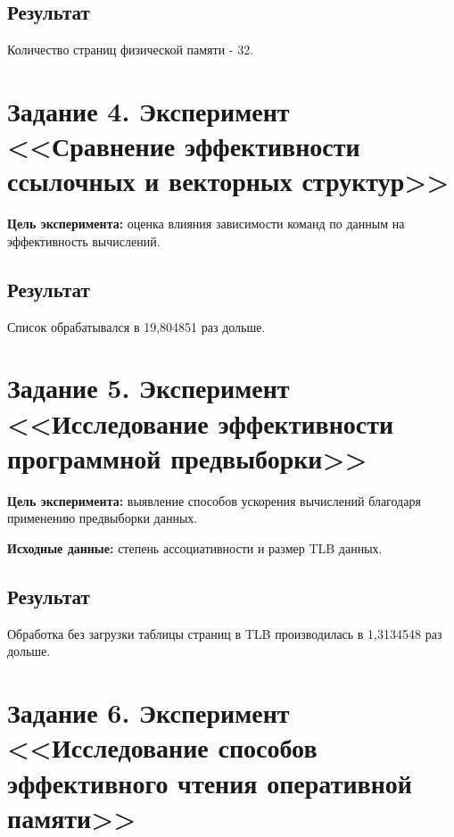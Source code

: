         \subsection*{Результат}
        
            Количество страниц физической памяти - 32.
        
    \newpage
        
    \section{Задание 4. Эксперимент <<Сравнение эффективности ссылочных и векторных структур>>}
    
        \textbf{Цель   эксперимента:} оценка   влияния   зависимости   команд   по   данным   на эффективность вычислений. 
        
        
        \subsection*{Результат}
        
        Список обрабатывался в 19,804851 раз дольше.
        
    \newpage
        
    \section{Задание 5. Эксперимент <<Исследование эффективности программной предвыборки>>}
    
        \textbf{Цель   эксперимента:} выявление   способов   ускорения   вычислений   благодаря применению предвыборки данных.
        
        \textbf{Исходные данные:} степень ассоциативности и размер TLB данных.
        
        
        \subsection*{Результат}
        
        Обработка без загрузки таблицы страниц в TLB производилась в 1,3134548 раз дольше.
        
    \newpage
    
    \section{Задание 6. Эксперимент <<Исследование способов эффективного  чтения оперативной памяти>>}
    
